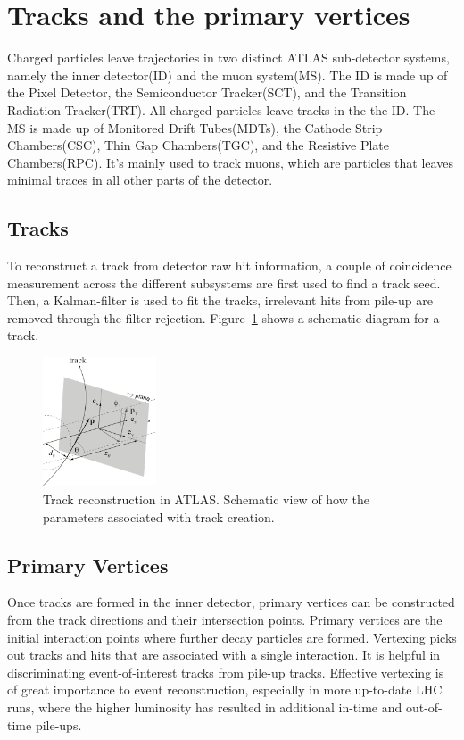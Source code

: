 \section{Tracks and the primary vertices}
\label{sec:Tracks}
Charged particles leave trajectories in two distinct ATLAS sub-detector systems, namely the inner detector(ID) and the muon system(MS). The ID is made up of the Pixel Detector, the Semiconductor Tracker(SCT), and the Transition Radiation Tracker(TRT). All charged particles leave tracks in the the ID. The MS is made up of Monitored Drift Tubes(MDTs), the Cathode Strip Chambers(CSC), Thin Gap Chambers(TGC), and the Resistive Plate Chambers(RPC). It's mainly used to track muons,
which are particles that leaves minimal traces in all other parts of the detector. 

\subsection{Tracks}
To reconstruct a track from detector raw hit information, a couple of coincidence measurement across the different subsystems are first used to find a track seed. Then, a Kalman-filter is used to fit the tracks, irrelevant hits from pile-up are removed through the filter rejection.  
Figure~\ref{fig:track} shows a schematic diagram for a track.

\begin{figure}[!htb]
    \begin{center}
        \includegraphics[width=0.3\textwidth]{figures/common_ana/Track}
        \caption{ 
            Track reconstruction in ATLAS. Schematic view of how the parameters associated with track creation.
        }
        \label{fig:track}
    \end{center}
\end{figure}

\subsection{Primary Vertices}
Once tracks are formed in the inner detector, primary vertices can be constructed from the track directions and their intersection points. Primary vertices are the initial interaction points where further decay particles are formed. Vertexing picks out tracks and hits that are associated with a single interaction. It is helpful in discriminating event-of-interest tracks from pile-up tracks. Effective vertexing is of great importance to event reconstruction, especially in more up-to-date
LHC runs, where the higher luminosity has resulted in additional in-time and out-of-time pile-ups.

